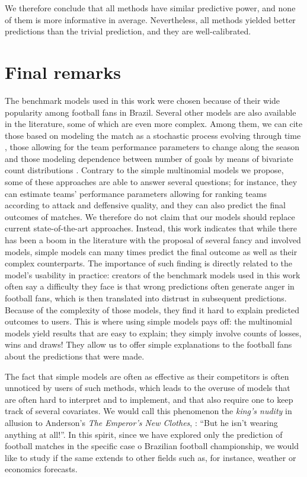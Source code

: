 \documentclass[journal,article,accept,moreauthors,pdftex,12pt,a4paper]{mdpi}
\begin{document}
	
	We therefore conclude that all methods have similar predictive power, and none of them is more informative in average.
	Nevertheless, all methods yielded better predictions than the trivial prediction, and they are well-calibrated.
	
	\section{Final remarks}
	\label{sec::remarks}
	
	{\color{blue}The benchmark models used in this work were chosen because of their wide popularity among football fans in Brazil.
	Several other models are also available in the literature, some of which are even more complex.
	Among them, we can cite those based on modeling the match as a stochastic process evolving through time \citep{Dixon98, Volf2009, Titman2015}, those allowing for the team performance parameters to change along the season \citep{Rue2000, Crowder2002, Owen2011, Koopman2015} and those modeling dependence between number of goals by means of bivariate count distributions \citep{Dixon97, Karlis2003, McHale2007, McHale2011}. 
Contrary to the simple multinomial models we propose,	some of these approaches are able to answer several questions;  for instance, they can estimate teams' performance parameters allowing for ranking teams according to attack and deffensive quality, and 
 they can also predict the final outcomes of matches. We therefore do not claim that our models should replace
	current state-of-the-art approaches. Instead, this work
	indicates that while there has been a boom in the literature with the proposal of several fancy and involved models,
	simple models can many times predict the final outcome as well as their complex counterparts. 
	The importance of such finding is directly related to the model's usability in practice: creators of the
	benchmark models used in this work often say a difficulty they face is that
	wrong predictions often  generate anger in football fans, which is then translated into distrust
	in subsequent predictions. Because of the complexity of those models, they find it hard to explain predicted outcomes
	to users. This is where using simple models pays off:  the multinomial models yield results that are
	easy to explain; they simply involve counts of losses, wins and draws!
	They allow us to offer simple explanations to the football fans about the predictions that were made.} 
	
{\color{blue}The fact that simple models are often as effective as their competitors is often unnoticed by users of such methods, which leads to the overuse of models that are often
	hard to interpret and to implement, and that also require one to keep track of several covariates. We would call this phenomenon the {\it king's nudity}  in allusion to Anderson's {\it The Emperor's New Clothes}, \cite{emperor}: ``But he isn't wearing anything at all!''. In this spirit, since we have explored only the prediction of football matches in the specific case o Brazilian football championship, we would like to study if the same extends to other fields such as, for instance, weather or economics forecasts.}
		
\end{document}

